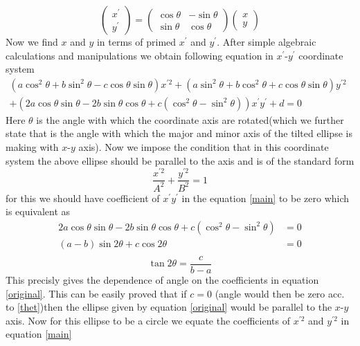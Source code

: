 \documentclass[a4paper]{article}
\begin{document}
\[
\left( \begin{array}{c}
x^{\prime} \\
y^{\prime}
\end{array} \right) = 
\left( \begin{array}{cc}
\cos\theta & -\sin\theta \\
\sin\theta & \cos\theta
\end{array} \right)
%
\left( \begin{array}{c}
x \\
y
\end{array} \right)
\]
Now we find $x$ and $y$ in terms of primed $x^{\prime}$ and $y^{\prime}$. After simple algebraic calculations and manipulations we obtain following equation in $x^{\prime}$-$y^{\prime}$ coordinate system
\begin{equation}\label{main}
\begin{split}
(a\cos^{2}\theta+b\sin^{2}\theta-c\cos\theta\sin\theta)x^{\prime 2} + (a\sin^{2}\theta+b\cos^{2}\theta+c\cos\theta\sin\theta)y^{\prime 2}&\\
+(2a\cos\theta\sin\theta-2b\sin\theta\cos\theta+c(\cos^{2}\theta-\sin^{2}\theta))x^{\prime}y^{\prime}+d=0
\end{split}
\end{equation}Here $\theta$ is the angle with which the coordinate axis are rotated(which we further state that is the angle with which the major and minor axis of the tilted ellipse is making with $x$-$y$ axis). Now we impose the condition that in this coordinate system the above ellipse should be parallel to the axis and is of the standard form
\begin{equation}
\frac{x^{\prime 2}}{A^{2}}+\frac{y^{\prime 2}}{B^{2}}=1
\end{equation}for this we should have coefficient of $x^{\prime}y^{\prime}$ in the equation \ref{main} to be zero which is equivalent as
\[
\begin{split}
2a\cos\theta\sin\theta-2b\sin\theta\cos\theta+c(\cos^{2}\theta-\sin^{2}\theta) &= 0 \\
(a-b)\sin2\theta+c\cos2\theta &= 0\\
\end{split}
\]
\begin{equation}\label{thet}
\tan2\theta = \frac{c}{b-a}
\end{equation}
This precisly gives the dependence of angle on the coefficients in equation
\ref{original}. This can be easily proved that if $c=0$ (angle would then be zero acc. to \ref{thet})then the ellipse given by equation \ref{original} would be parallel to the $x$-$y$ axis. Now for this ellipse to be a circle we equate the coefficients of $x^{\prime 2}$ and $y^{\prime 2}$ in equation \ref{main}
\end{document}
